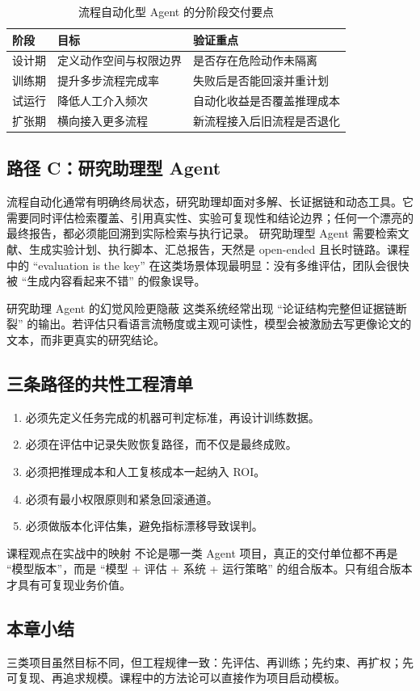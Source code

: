 \begin{table}[H]
\centering
\begin{tabular}{p{2.6cm}p{4.2cm}p{4.8cm}}
\toprule
\textbf{阶段} & \textbf{目标} & \textbf{验证重点} \\
\midrule
设计期 & 定义动作空间与权限边界 & 是否存在危险动作未隔离 \\
训练期 & 提升多步流程完成率 & 失败后是否能回滚并重计划 \\
试运行 & 降低人工介入频次 & 自动化收益是否覆盖推理成本 \\
扩张期 & 横向接入更多流程 & 新流程接入后旧流程是否退化 \\
\bottomrule
\end{tabular}
\caption{流程自动化型 Agent 的分阶段交付要点}
\end{table}

\subsection{路径 C：研究助理型 Agent}
流程自动化通常有明确终局状态，研究助理却面对多解、长证据链和动态工具。它需要同时评估检索覆盖、引用真实性、实验可复现性和结论边界；任何一个漂亮的最终报告，都必须能回溯到实际检索与执行记录。
研究助理型 Agent 需要检索文献、生成实验计划、执行脚本、汇总报告，天然是 open-ended 且长时链路。课程中的 ``evaluation is the key'' 在这类场景体现最明显：没有多维评估，团队会很快被 ``生成内容看起来不错'' 的假象误导。

\begin{warningbox}{研究助理 Agent 的幻觉风险更隐蔽}
这类系统经常出现 ``论证结构完整但证据链断裂'' 的输出。若评估只看语言流畅度或主观可读性，模型会被激励去写更像论文的文本，而非更真实的研究结论。
\end{warningbox}

\subsection{三条路径的共性工程清单}
\begin{enumerate}
    \item 必须先定义任务完成的机器可判定标准，再设计训练数据。
    \item 必须在评估中记录失败恢复路径，而不仅是最终成败。
    \item 必须把推理成本和人工复核成本一起纳入 ROI。
    \item 必须有最小权限原则和紧急回滚通道。
    \item 必须做版本化评估集，避免指标漂移导致误判。
\end{enumerate}

\begin{importantbox}{课程观点在实战中的映射}
不论是哪一类 Agent 项目，真正的交付单位都不再是 ``模型版本''，而是 ``模型 + 评估 + 系统 + 运行策略'' 的组合版本。只有组合版本才具有可复现业务价值。
\end{importantbox}

\subsection{本章小结}
三类项目虽然目标不同，但工程规律一致：先评估、再训练；先约束、再扩权；先可复现、再追求规模。课程中的方法论可以直接作为项目启动模板。


